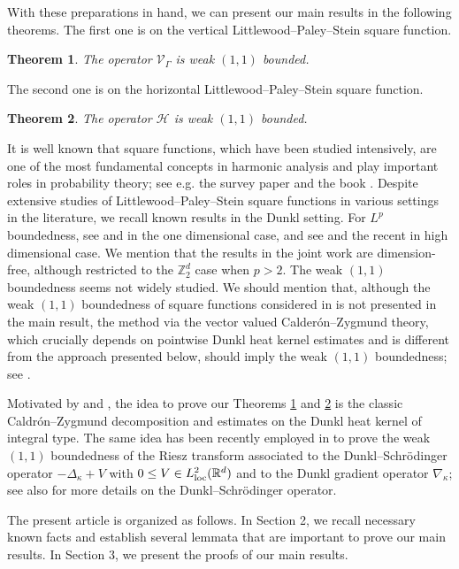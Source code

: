 \documentclass[11pt,a4paper]{article}
\def\R{\mathbb{R}}
\def\loc{\textup{loc}}
\newtheorem{theorem}{Theorem}[section]
\theoremstyle{definition}\newtheorem{remark}[theorem]{Remark}
\begin{document}
With these preparations in hand,  we can present our main results in the following theorems. The first one is on the vertical Littlewood--Paley--Stein square function.
\begin{theorem}\label{main-thm-v}
The operator $\mathcal{V}_{\Gamma}$ is weak $(1,1)$ bounded.
\end{theorem}

The second one is on the horizontal Littlewood--Paley--Stein square function.
\begin{theorem}\label{main-thm-h}
The operator $\mathcal{H}$ is weak $(1,1)$ bounded.
\end{theorem}

It is well known that square functions, which have been studied intensively, are one of the most fundamental concepts in harmonic analysis and play important roles in probability theory; see e.g. the survey paper \cite{Stein1982} and the book \cite{St1970}. Despite extensive studies of Littlewood--Paley--Stein square functions in various settings in the literature, we recall known results in the Dunkl setting. For $L^p$ boundedness,  see  \cite{Soltani2005} and \cite{LZL2017} in the one dimensional case, and see \cite{Soltani05,AmSi2012} and the recent \cite{LZ2020,DH2020} in high dimensional case. We mention that the results in the joint work \cite{LZ2020} are dimension-free, although restricted to the $\mathbb{Z}_2^d$ case when $p>2$. The weak $(1,1)$ boundedness seems not widely studied.  We should mention that, although the weak $(1,1)$ boundedness of square functions considered in \cite{DH2020} is not presented in the main result, the method via the vector valued Calder\'{o}n--Zygmund theory, which crucially depends on pointwise Dunkl heat kernel estimates and is different from the approach presented below, should imply the weak $(1,1)$ boundedness; see \cite[Proposition 3.1]{DH2020}.

Motivated by \cite{ADH2019} and \cite{CDD}, the idea to prove our Theorems \ref{main-thm-v} and \ref{main-thm-h} is the classic Caldr\'{o}n--Zygmund decomposition and  estimates on the Dunkl heat kernel of integral type. The same idea has been recently employed in \cite{AmHa2020} to prove the weak $(1,1)$ boundedness of the Riesz transform associated to the Dunkl--Schr\"{o}dinger operator $-\Delta_\kappa+V$ with $0\leq V\in L^2_{\loc}(\R^d)$ and to the Dunkl gradient operator $\nabla_\kappa$; see also \cite{AmHa2019} for more details on the Dunkl--Schr\"{o}dinger operator.

The present article is organized as follows. In Section 2, we recall necessary known facts and establish several lemmata that are important to prove our main results. In Section 3, we present the proofs of our main results.
\end{document}
